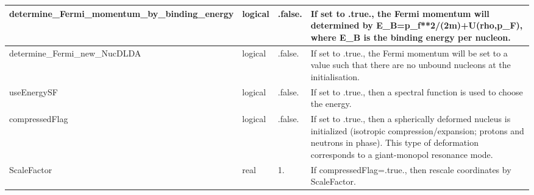 \documentclass{article}
\begin{document}
\begin{longtable}{llll}
\midrule
determine\_Fermi\_momentum\_by\_binding\_energy & \begin{minipage}[t]{2cm}logical\end{minipage} & \begin{minipage}[t]{2cm}.false.\end{minipage} & \begin{minipage}[t]{12cm}If set to .true., the Fermi momentum will determined by E\_B=p\_f**2/(2m)+U(rho,p\_F), where E\_B is the binding energy per nucleon.\end{minipage}\\*
\midrule
determine\_Fermi\_new\_NucDLDA & \begin{minipage}[t]{2cm}logical\end{minipage} & \begin{minipage}[t]{2cm}.false.\end{minipage} & \begin{minipage}[t]{12cm}If set to .true., the Fermi momentum will be set to a value such that there are no unbound nucleons at the initialisation.\end{minipage}\\*
\midrule
useEnergySF & \begin{minipage}[t]{2cm}logical\end{minipage} & \begin{minipage}[t]{2cm}.false.\end{minipage} & \begin{minipage}[t]{12cm}If set to .true., then a spectral function is used to choose the energy.\end{minipage}\\*
\midrule
compressedFlag & \begin{minipage}[t]{2cm}logical\end{minipage} & \begin{minipage}[t]{2cm}.false.\end{minipage} & \begin{minipage}[t]{12cm}If set to .true., then a spherically deformed nucleus is initialized (isotropic compression/expansion; protons  and  neutrons in phase). This type of deformation corresponds to a giant-monopol resonance mode.\end{minipage}\\*
\midrule
ScaleFactor & \begin{minipage}[t]{2cm}real\end{minipage} & \begin{minipage}[t]{2cm}1.\end{minipage} & \begin{minipage}[t]{12cm}If compressedFlag=.true., then rescale coordinates by ScaleFactor.\end{minipage}\\*

\end{longtable}
\end{document}
